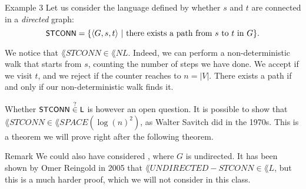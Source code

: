\documentclass[a4paper]{article}
\begin{document}
\begin{parag}{Example 3}
    Let us consider the language defined by whether $s$ and $t$ are connected in a \textit{directed} graph: 
    \[\lang{STCONN} = \left\{\left\langle G, s, t \right\rangle \suchthat \text{there exists a path from $s$ to $t$ in $G$}\right\}.\]

    We notice that $\lang{STCONN} \in \lang{NL}$. Indeed, we can perform a non-deterministic walk that starts from $s$, counting the number of steps we have done. We accept if we visit $t$, and we reject if the counter reaches to $n = \left|V\right|$. There exists a path if and only if our non-deterministic walk finds it.

    Whether $\lang{STCONN} \over{\in}{?} \lang{L}$ is however an open question. It is possible to show that $\lang{STCONN} \in \lang{SPACE}\left(\log\left(n\right)^2\right)$, as Walter Savitch did in the 1970s. This is a theorem we will prove right after the following theorem.

    \begin{subparag}{Remark}
        We could also have considered , where $G$ is undirected. It has been shown by Omer Reingold in 2005 that $\lang{UNDIRECTED-STCONN} \in \lang{L}$, but this is a much harder proof, which we will not consider in this class.
    \end{subparag}
\end{parag}
\end{document}
